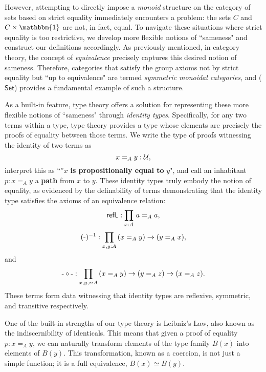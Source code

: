 \documentclass[main.tex]{subfiles}
\begin{document}
However, attempting to directly impose a \textit{monoid} structure on the category of sets based on strict equality immediately encounters a problem: the sets $C$ and $C \times \mathbbm{1}$ are not, in fact, equal. To navigate these situations where strict equality is too restrictive, we develop more flexible notions of ``sameness" and construct our definitions accordingly. As previously mentioned, in category theory, the concept of \textit{equivalence} precisely captures this desired notion of sameness. Therefore, categories that satisfy the group axioms not by strict equality but ``up to equivalence" are termed \textit{symmetric monoidal categories}, and ($\mathsf{Set}$) provides a fundamental example of such a structure.

As a built-in feature, type theory offers a solution for representing these more flexible notions of ``sameness" through \textit{identity types}. Specifically, for any two terms within a type, type theory provides a type whose elements are precisely the proofs of equality between those terms. We write the type of proofs witnessing the identity of two terms as \[x=_A y : \mathcal{U},\] interpret this as ``''$x$ \textbf{is propositionally equal to} $y$", and call an inhabitant $p : x =_A y$ a \textbf{path} from $x$ to $y$. These identity types truly embody the notion of equality, as evidenced by the definability of terms demonstrating that the identity type satisfies the axioms of an equivalence relation:
 $$\refl{\text-} : \prd{x:A}a=_A a,$$
 $$(\text-)^{-1}:\prd{x,y:A}(x =_A y ) \to (y =_A x),$$ and
 $$\text-\circ\text- : \prd{x,y,z : A} (x =_A y) \to (y =_A z) \to (x =_A z).$$
These terms form data witnessing that identity types are reflexive, symmetric, and transitive respectively.

One of the built-in strengths of our type theory is Leibniz's Law, also known as the indiscernibility of identicals. This means that given a proof of equality $p : x =_A y$, we can naturally transform elements of the type family $B(x)$ into elements of $B(y)$. This transformation, known as a coercion, is not just a simple function; it is a full equivalence, $B(x) \simeq B(y)$.
\end{document}
